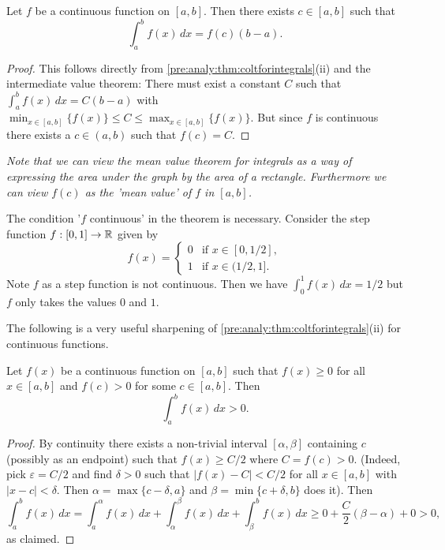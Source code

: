 \documentclass[10pt, a4paper]{article}
\begin{document}
\begin{theorem}
    Let $f$ be a continuous function on $[a, b]$.
    Then there exists $c \in [a, b]$ such that
    \[
    \int_{a}^{b}f(x)\,dx = f(c)(b - a).
    \]
    \begin{proof}
        This follows directly from \autoref{pre:analy:thm:coltforintegrals}(ii) and the intermediate value theorem:
        There must exist a constant $C$ such that $\int_{a}^{b}f(x)\,dx = C(b - a)$ with $\min_{x \in [a, b]}\{f(x)\} \leq C \leq \max_{x \in [a, b]}\{f(x)\}$.
        But since $f$ is continuous there exists a $c \in (a, b)$ such that $f(c) = C$.
    \end{proof}
\end{theorem}

\textit{Note that we can view the mean value theorem for integrals as a way of expressing the area under the graph by the area of a rectangle.
Furthermore we can view $f(c)$ as the 'mean value' of $f$ in $[a, b]$.}

\begin{example}
    The condition '$f$ continuous' in the theorem is necessary.
    Consider the step function $f : [0, 1] \rightarrow \mathbb{R}$ given by
    \[
    f(x) = \begin{cases}
        0 & \text{if } x \in [0, 1 / 2], \\
        1 & \text{if } x \in (1 / 2, 1].
    \end{cases}
    \]
    Note $f$ as a step function is not continuous.
    Then we have $\int_{0}^{1}f(x)\,dx = 1 / 2$ but $f$ only takes the values $0$ and $1$.
\end{example}

The following is a very useful sharpening of \autoref{pre:analy:thm:coltforintegrals}(ii) for continuous functions.

\begin{proposition}
    Let $f(x)$ be a continuous function on $[a, b]$ such that $f(x) \geq 0$ for all $x \in [a, b]$ and $f(c) > 0$ for some $c \in [a, b]$.
    Then
    \[
    \int_{a}^{b}f(x)\,dx > 0.
    \]
    \begin{proof}
        By continuity there exists a non-trivial interval $[\alpha, \beta]$ containing $c$
        (possibly as an endpoint)
        such that $f(x) \geq C / 2$ where $C = f(c) > 0$.
        (Indeed,
        pick $\varepsilon = C / 2$ and find $\delta > 0$ such that $|f(x) - C| < C / 2$ for all $x \in [a, b]$ with $|x - c| < \delta$.
        Then $\alpha = \max\{c - \delta, a\}$ and $\beta = \min\{c + \delta, b\}$ does it).
        Then
        \[
        \int_{a}^{b}f(x)\,dx = \int_{a}^{\alpha}f(x)\,dx + \int_{\alpha}^{\beta}f(x)\,dx + \int_{\beta}^{b}f(x)\,dx \geq 0 + \frac{C}{2}(\beta - \alpha) + 0 > 0,
        \]
        as claimed.
    \end{proof}
\end{proposition}
\end{document}
